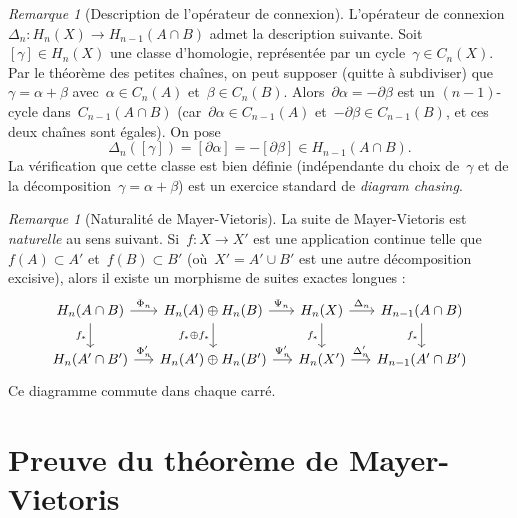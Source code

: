 \documentclass[12pt,a4paper,openany]{book}
\theoremstyle{definition}
\theoremstyle{plain}
\theoremstyle{remark}
\newtheorem{remarque}[definition]{Remarque}
\begin{document}
\begin{remarque}[Description de l'opérateur de connexion]\label{rem:mv-connexion}
L'opérateur de connexion~$\Delta_n \colon H_n(X) \to H_{n-1}(A \cap B)$ admet la
description suivante. Soit~$[\gamma] \in H_n(X)$ une classe d'homologie, représentée
par un cycle~$\gamma \in C_n(X)$. Par le théorème des petites chaînes, on peut supposer
(quitte à subdiviser) que~$\gamma = \alpha + \beta$ avec~$\alpha \in C_n(A)$
et~$\beta \in C_n(B)$. Alors~$\partial \alpha = -\partial \beta$ est un $(n-1)$-cycle
dans~$C_{n-1}(A \cap B)$ (car~$\partial \alpha \in C_{n-1}(A)$
et~$-\partial \beta \in C_{n-1}(B)$, et ces deux chaînes sont égales). On pose
\[
  \Delta_n([\gamma]) = [\partial \alpha] = -[\partial \beta] \in H_{n-1}(A \cap B).
\]
La vérification que cette classe est bien définie (indépendante du choix de~$\gamma$
et de la décomposition~$\gamma = \alpha + \beta$) est un exercice standard
de \emph{diagram chasing}.
\end{remarque}

\begin{remarque}[Naturalité de Mayer-Vietoris]\label{rem:mv-naturalite}
La suite de Mayer-Vietoris est \emph{naturelle} au sens suivant. Si~$f \colon X \to X'$
est une application continue telle que~$f(A) \subset A'$ et~$f(B) \subset B'$
(où~$X' = A' \cup B'$ est une autre décomposition excisive), alors il existe un
morphisme de suites exactes longues :
\[
\begin{tikzcd}[column sep=1.4em]
  H_n(A \cap B) \ar[r, "\Phi_n"] \ar[d, "f_*"']
  & H_n(A) \oplus H_n(B) \ar[r, "\Psi_n"] \ar[d, "f_* \oplus f_*"']
  & H_n(X) \ar[r, "\Delta_n"] \ar[d, "f_*"']
  & H_{n-1}(A \cap B) \ar[d, "f_*"']\\
  H_n(A' \cap B') \ar[r, "\Phi_n'"]
  & H_n(A') \oplus H_n(B') \ar[r, "\Psi_n'"]
  & H_n(X') \ar[r, "\Delta_n'"]
  & H_{n-1}(A' \cap B')
\end{tikzcd}
\]
Ce diagramme commute dans chaque carré.
\end{remarque}

\section{Preuve du théorème de Mayer-Vietoris}\label{sec:mv-preuve}
\end{document}
